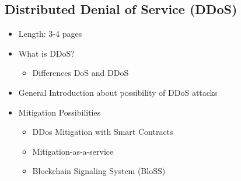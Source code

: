 \subsection{Distributed Denial of Service (DDoS)}

\begin{itemize}
  \item Length: 3-4 pages
  \item What is DDoS?
  \begin{itemize}
    \item Differences DoS and DDoS
  \end{itemize}
  \item General Introduction about possibility of DDoS attacks
  \item Mitigation Possibilities
  \begin{itemize}
    \item DDos Mitigation with Smart Contracts
    \item Mitigation-as-a-service
    \item Blockchain Signaling System (BloSS)
  \end{itemize}
\end{itemize}
